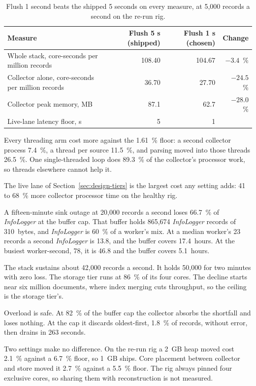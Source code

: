 \begin{table}[htbp]\caption{Flush 1 second beats the shipped 5 seconds on every measure, at 5,000 records a second on the re-run rig.}\label{tab:flush}\centering\footnotesize
\begin{tabular}{@{}lrrr@{}}
\toprule
Measure & Flush 5 s (shipped) & Flush 1 s (chosen) & Change \\
\midrule
Whole stack, core-seconds per million records & 108.40 & 104.67 & $-3.4$~\% \\
Collector alone, core-seconds per million records & 36.70 & 27.70 & $-24.5$~\% \\
Collector peak memory, MB & 87.1 & 62.7 & $-28.0$~\% \\
Live-lane latency floor, s & 5 & 1 & \\
\bottomrule
\end{tabular}
\end{table}

Every threading arm cost more against the 1.61~\% floor: a second collector process 7.4~\%, a thread per source 11.5~\%, and parsing moved into those threads 26.5~\%. One single-threaded loop does 89.3~\% of the collector's processor work, so threads elsewhere cannot help it.

The live lane of Section~\ref{sec:design-tiers} is the largest cost any setting adds: 41 to 68~\% more collector processor time on the healthy rig.

A fifteen-minute sink outage at 20,000 records a second loses 66.7~\% of \textit{InfoLogger} at the buffer cap. That buffer holds 865,674 \textit{InfoLogger} records of 310~bytes, and \textit{InfoLogger} is 60~\% of a worker's mix. At a median worker's 23 records a second \textit{InfoLogger} is 13.8, and the buffer covers 17.4~hours. At the busiest worker-second, 78, it is 46.8 and the buffer covers 5.1~hours.

The stack sustains about 42,000 records a second. It holds 50,000 for two minutes with zero loss. The storage tier runs at 86~\% of its four cores. The decline starts near six million documents, where index merging cuts throughput, so the ceiling is the storage tier's.

Overload is safe. At 82~\% of the buffer cap the collector absorbs the shortfall and loses nothing. At the cap it discards oldest-first, 1.8~\% of records, without error, then drains in 263 seconds.

Two settings make no difference. On the re-run rig a 2~GB heap moved cost 2.1~\% against a 6.7~\% floor, so 1~GB ships. Core placement between collector and store moved it 2.7~\% against a 5.5~\% floor. The rig always pinned four exclusive cores, so sharing them with reconstruction is not measured.

